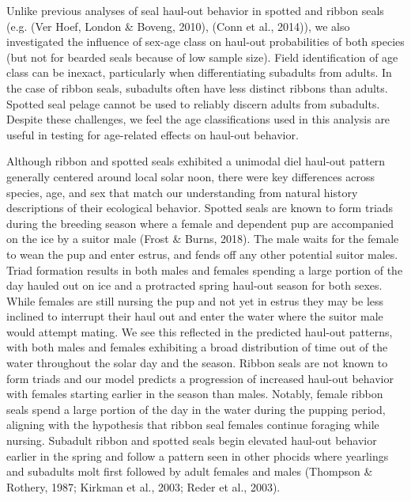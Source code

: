 \documentclass[fleqn,10pt,lineno]{wlpeerj} %
\begin{document}
Unlike previous analyses of seal haul-out behavior in spotted and ribbon seals
(e.g. (Ver Hoef, London \& Boveng, 2010), (Conn et al., 2014)), we also investigated the influence of
sex-age class on haul-out probabilities of both species (but not for bearded seals
because of low sample size). Field identification of age class can be inexact,
particularly when differentiating subadults from adults. In the case of ribbon
seals, subadults often have less distinct ribbons than adults. Spotted seal
pelage cannot be used to reliably discern adults from subadults. Despite these
challenges, we feel the age classifications used in this analysis are useful in
testing for age-related effects on haul-out behavior.

Although ribbon and spotted seals exhibited a
unimodal diel haul-out pattern generally centered around local solar noon, there
were key differences across species, age, and sex that match our understanding
from natural history descriptions of their ecological behavior. Spotted seals
are known to form triads during the breeding season where a female and dependent
pup are accompanied on the ice by a suitor male (Frost \& Burns, 2018). The male waits for
the female to wean the pup and enter estrus, and fends off any other potential
suitor males. Triad formation results in both males and females spending a large
portion of the day hauled out on ice and a protracted spring haul-out season for
both sexes. While females are still nursing the pup and not yet in estrus they
may be less inclined to interrupt their haul out and enter the water where the
suitor male would attempt mating. We see this reflected in the predicted
haul-out patterns, with both males and females exhibiting a broad distribution
of time out of the water throughout the solar day and the season. Ribbon seals
are not known to form triads and our model predicts a progression of increased
haul-out behavior with females starting earlier in the season than males.
Notably, female ribbon seals spend a large portion of the day in the water
during the pupping period, aligning with the hypothesis that ribbon seal females
continue foraging while nursing. Subadult ribbon and spotted seals begin
elevated haul-out behavior earlier in the spring and follow a pattern seen in
other phocids where yearlings and subadults molt first followed by adult females
and males (Thompson \& Rothery, 1987; Kirkman et al., 2003; Reder et al., 2003).
\end{document}

